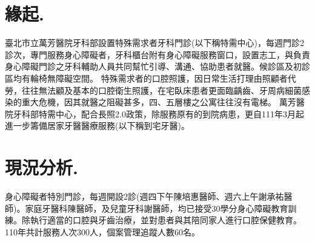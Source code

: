 



\section*{緣起.}
臺北市立萬芳醫院牙科部設置特殊需求者牙科門診(以下稱特需中心)，每週門診2診次，專門服務身心障礙者，牙科櫃台附有身心障礙服務窗口，設置志工，與負責身心障礙門診之牙科輔助人員共同幫忙引導、溝通、協助患者就醫。候診區及初診區均有輪椅無障礙空間。
特殊需求者的口腔照護，因日常生活打理由照顧者代勞，往往無法顧及基本的口腔衛生照護，在宅臥床患者更面臨齲齒、牙周病細菌感染的重大危機，因其就醫之阻礙甚多，四、五層樓之公寓往往沒有電梯。
萬芳醫院牙科部特需中心，配合長照2.0政策，除服務原有的到院病患，更自111年3月起進一步籌備居家牙醫醫療服務(以下稱到宅牙醫)。

\section*{現況分析.}
身心障礙者特別門診，每週開設2診(週四下午陳培惠醫師、週六上午謝承祐醫師)。家庭牙醫科陳醫師，及兒童牙科謝醫師，均已接受30學分身心障礙教育訓練。除執行適當的口腔與牙齒治療，並對患者與其陪同家人進行口腔保健教育。110年共計服務人次300人，個案管理追蹤人數60名。
	

